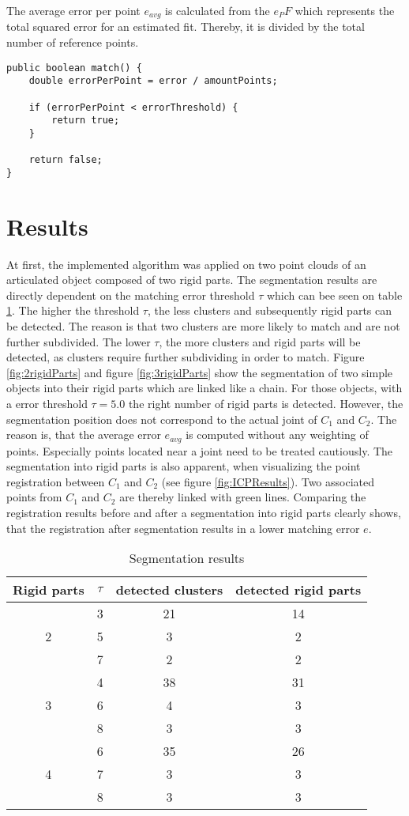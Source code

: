 The average error per point $e_{avg}$ is calculated from the $e_PF$ which represents the total squared error for an estimated fit. Thereby, it is divided by the total number of reference points. 
%
\begin{lstlisting}
public boolean match() {
	double errorPerPoint = error / amountPoints;

	if (errorPerPoint < errorThreshold) {
		return true;
	}
	
	return false;
}

\end{lstlisting}
\section{Results}
At first, the implemented algorithm was applied on two point clouds of an articulated object composed of two rigid parts. The segmentation results are directly dependent on the matching error threshold $\tau$ which can bee seen on table \ref{table:segmentation_results}. The higher the threshold $\tau$, the less clusters and subsequently rigid parts can be detected. The reason is that two clusters are more likely to match and are not further subdivided. The lower $\tau$, the more clusters and rigid parts will be detected, as clusters require further subdividing in order to match. Figure \ref{fig:2rigidParts} and figure \ref{fig:3rigidParts} show the segmentation of two simple objects into their rigid parts which are linked like a chain. For those objects, with a error threshold $\tau = 5.0$ the right number of rigid parts is detected. However, the segmentation position does not correspond to the actual joint of $C_1$ and $C_2$. The reason is, that the average error $e_{avg}$ is computed without any weighting of points. Especially points located near a joint need to be treated cautiously.
The segmentation into rigid parts is also apparent, when visualizing the point registration between $C_1$ and $C_2$ (see figure \ref{fig:ICPResults}). Two associated points from $C_1$ and $C_2$ are thereby linked with green lines. Comparing the registration results before and after a segmentation into rigid parts clearly shows, that the registration after segmentation results in a lower matching error $e$.
\begin{table}
	\centering\small
	\begin{tabular}{ |c|c|c|c| } 
		\hline
		Rigid parts & $\tau$ & detected clusters & detected rigid parts \\
		\hline
		& 3 & 21 & 14 \\ 
		2& 5 & 3 & 2 \\
		& 7 & 2 & 2 \\
		\hline
		& 4 & 38 & 31 \\ 
		3 & 6 & 4 & 3 \\
		& 8 & 3 & 3 \\
		\hline
		& 6 & 35 & 26 \\ 
		4 & 7 & 3 & 3 \\
		& 8 & 3 & 3 \\
		\hline
	\end{tabular}
	\caption{Segmentation results}
	\label{table:segmentation_results}
\end{table}
